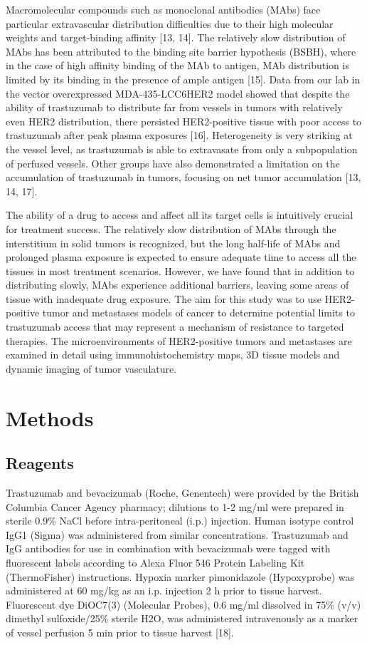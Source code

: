 Macromolecular compounds such as monoclonal antibodies (MAbs) face particular extravascular distribution difficulties due to their high molecular weights and target-binding affinity [13, 14].
The relatively slow distribution of MAbs has been attributed to the binding site barrier hypothesis (BSBH), where in the case of high affinity binding of the MAb to antigen, MAb distribution is limited by its binding in the presence of ample antigen [15].
Data from our lab in the vector overexpressed MDA-435-LCC6HER2 model showed that despite the ability of trastuzumab to distribute far from vessels in tumors with relatively even HER2 distribution, there persisted HER2-positive tissue with poor access to trastuzumab after peak plasma exposures [16].
Heterogeneity is very striking at the vessel level, as trastuzumab is able to extravasate from only a subpopulation of perfused vessels.
Other groups have also demonstrated a limitation on the accumulation of trastuzumab in tumors, focusing on net tumor accumulation [13, 14, 17].

The ability of a drug to access and affect all its target cells is intuitively crucial for treatment success.
The relatively slow distribution of MAbs through the interstitium in solid tumors is recognized, but the long half-life of MAbs and prolonged plasma exposure is expected to ensure adequate time to access all the tissues in most treatment scenarios.
However, we have found that in addition to distributing slowly, MAbs experience additional barriers, leaving some areas of tissue with inadequate drug exposure.
The aim for this study was to use HER2-positive tumor and metastases models of cancer to determine potential limits to trastuzumab access that may represent a mechanism of resistance to targeted therapies.
The microenvironments of HER2-positive tumors and metastases are examined in detail using immunohistochemistry maps, 3D tissue models and dynamic imaging of tumor vasculature.

\section{Methods}

\subsection{Reagents}

Trastuzumab and bevacizumab (Roche, Genentech) were provided by the British Columbia Cancer Agency pharmacy; dilutions to 1-2 mg/ml were prepared in sterile 0.9\% NaCl before intra-peritoneal (i.p.) injection.
Human isotype control IgG1 (Sigma) was administered from similar concentrations.
Trastuzumab and IgG antibodies for use in combination with bevacizumab were tagged with fluorescent labels according to Alexa Fluor 546 Protein Labeling Kit (ThermoFisher) instructions.
Hypoxia marker pimonidazole (Hypoxyprobe) was administered at 60 mg/kg as an i.p.
injection 2 h prior to tissue harvest.
Fluorescent dye DiOC7(3) (Molecular Probes), 0.6 mg/ml dissolved in 75\% (v/v) dimethyl sulfoxide/25\% sterile H2O, was administered intravenously as a marker of vessel perfusion 5 min prior to tissue harvest [18].

